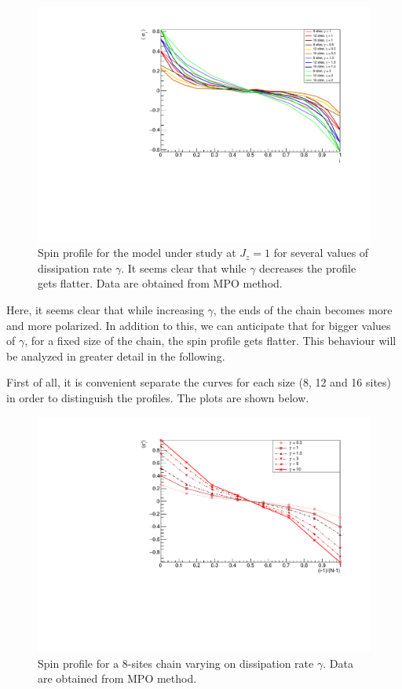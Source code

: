 \begin{figure}[H]
    \centering
    \includegraphics[scale=0.7]{Figures/LMcomparisonVSsizeANDdissipationRate.pdf}
    \caption{Spin profile for the model under study at $J_z = 1$ for several values of dissipation rate $\gamma$. It seems clear that while $\gamma$ decreases the profile gets flatter. Data are obtained from MPO method.}
    \label{fig:LMcompVSsizeANDdissRate}
\end{figure}

Here, it seems clear that while increasing $\gamma$, the ends of the chain becomes more and more polarized. In addition to this, we can anticipate that for bigger values of $\gamma$, for a fixed size of the chain, the spin profile gets flatter. This behaviour will be analyzed in greater detail in the following.

First of all, it is convenient separate the curves for each size (8, 12 and 16 sites) in order to distinguish the profiles. The plots are shown below.

\begin{figure}[H]
    \centering
    \includegraphics[scale=0.7]{Figures/8sites/8sites_LMvsGamma.pdf}
    \caption{Spin profile for a 8-sites chain varying on dissipation rate $\gamma$. Data are obtained from MPO method.}
    \label{fig:8sites_LMvsGamma}
\end{figure}

